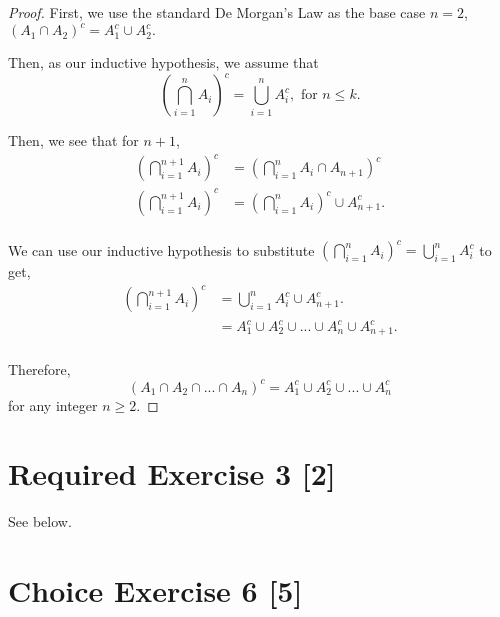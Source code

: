 \documentclass{article}
\begin{document}
\begin{enumerate}
{        \begin{proof}
            First, we use the standard De Morgan's Law as the base case \(n=2\),
            \(\left( A_1 \cap A_2 \right)^c = A_1^c \cup A_2^c.\)

            Then, as our inductive hypothesis, we assume that 
            \[ \left( \bigcap_{i=1}^{n} A_i \right)^c = \bigcup_{i=1}^{n} A_i^c, \text{ for } n \le k.\]

            Then, we see that for \(n+1\), 
            \begin{align*}
                \left( \bigcap_{i=1}^{n+1} A_i \right)^c &= \left( \bigcap_{i=1}^{n} A_i \cap A_{n+1} \right)^c \\
                \left( \bigcap_{i=1}^{n+1} A_i \right)^c &= \left( \bigcap_{i=1}^{n} A_i \right)^c \cup A_{n+1}^c .\\
            \end{align*}

            We can use our inductive hypothesis to substitute 
            \(\left( \bigcap_{i=1}^{n} A_i \right)^c = \bigcup_{i=1}^{n} A_i^c\)
            to get,
            \begin{align*}
                \left( \bigcap_{i=1}^{n+1} A_i \right)^c &= \bigcup_{i=1}^{n} A_i^c \cup A_{n+1}^c .\\
                &= A_1^c \cup A_2^c \cup ... \cup A_n^c \cup A_{n+1}^c .\\
            \end{align*}

            Therefore, 
            \[\left( A_1 \cap A_2 \cap ... \cap A_n \right)^c = A_1^c \cup A_2^c \cup ... \cup A_n^c \]
            for any integer \(n \ge 2\).
        \end{proof}
    }
\end{enumerate}

\section*{Required Exercise 3 [2]}
See below.

\section*{Choice Exercise 6 [5]}
\end{document}
